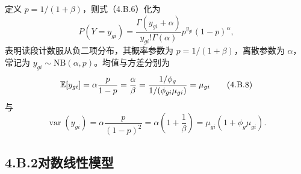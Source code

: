 定义 $p=1/(1+\beta)$，则式（4.B.6）化为
\begin{equation}
P(Y=y_{gi})=\frac{\Gamma(y_{gi}+\alpha)}{y_{gi}!\Gamma(\alpha)}p^{y_{gi}}(1-p)^\alpha,\tag{4.B.7}
\end{equation}
表明读段计数服从负二项分布，其概率参数为 $p=1/(1+\beta)$，离散参数为 $\alpha$，常记为 $y_{gi}\sim\mathrm{NB}(\alpha,p)$。均值与方差分别为
\begin{equation}
\mathbb{E}[y_{gi}]=\alpha\frac p{1-p}=\frac\alpha\beta
=\frac{1/\phi_g}{1/(\phi_{gi}\mu_{gi})}=\mu_{gi}\tag{4.B.8}
\end{equation}
与
\begin{equation}
\operatorname{var}(y_{gi})=\alpha\frac p{(1-p)^2}
=\alpha\left(1+\frac1\beta\right)=\mu_{gi}(1+\phi_g\mu_{gi}).\tag{4.B.9}
\end{equation}

\subsection*{4.B.2\quad 对数线性模型}

